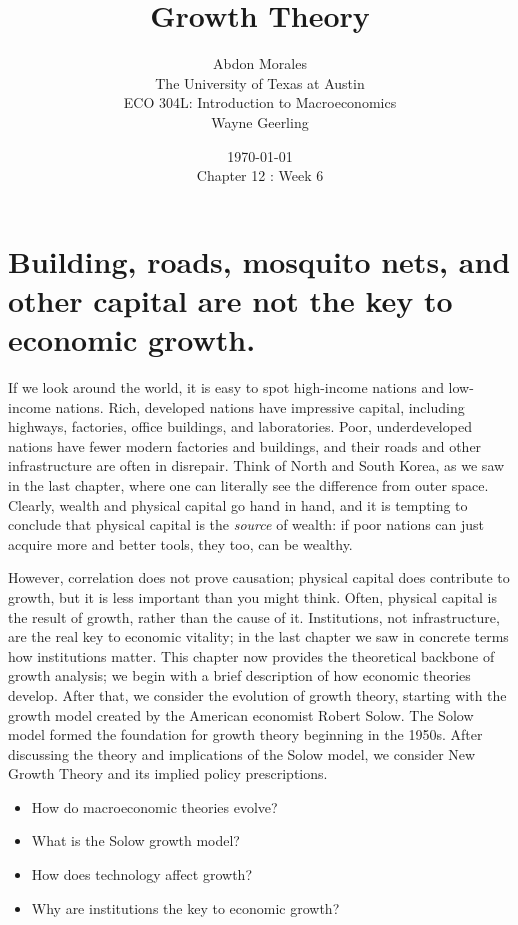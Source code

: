 \documentclass[11pt]{article} %
\title{Growth Theory}
\author{Abdon Morales \\ The University of Texas at Austin \\ ECO 304L: Introduction to Macroeconomics \\ Wayne Geerling}
\date{\today \\ Chapter 12 : Week 6}
\begin{document}
\maketitle
\section*{Building, roads, mosquito nets, and other capital are not the key to economic growth.}
If we look around the world, it is easy to spot high-income nations and low-income nations. Rich, developed nations have impressive capital, including highways, factories, office buildings, and laboratories. Poor, underdeveloped nations have fewer modern factories and buildings, and their roads and other infrastructure are often in disrepair. Think of North and South Korea, as we saw in the last chapter, where one can literally see the difference from outer space. Clearly, wealth and physical capital go hand in hand, and it is tempting to conclude that physical capital is the \textit{source} of wealth: if poor nations can just acquire more and better tools, they too, can be wealthy.

However, correlation does not prove causation; physical capital does contribute to growth, but it is less important than you might think. Often, physical capital is the result of growth, rather than the cause of it. Institutions, not infrastructure, are the real key to economic vitality; in the last chapter we saw in concrete terms how institutions matter. This chapter now provides the theoretical backbone of growth analysis; we begin with a brief description of how economic theories develop. After that, we consider the evolution of growth theory, starting with the growth model created by the American economist Robert Solow. The Solow model formed the foundation for growth theory beginning in the 1950s. After discussing the theory and implications of the Solow model, we consider New Growth Theory and its implied policy prescriptions.

\begin{tcolorbox}[width=\textwidth,colback={white},title={Big Questions},colbacktitle=yellow,coltitle=blue]
\begin{itemize}
\item How do macroeconomic theories evolve?
\item What is the Solow growth model?
\item How does technology affect growth?
\item Why are institutions the key to economic growth?
\end{itemize}
\end{tcolorbox}
\end{document}

